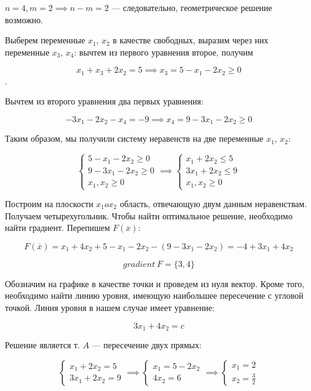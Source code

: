 \documentclass{article}
\begin{document}
$n = 4, m = 2 \implies n - m = 2$ — следовательно, геометрическое решение возможно.

Выберем переменные $x_1$, $x_2$ в качестве свободных, выразим через них переменные $x_3$, $x_4$: вычтем из первого уравнения второе, получим  

$$x_1 + x_3 + 2x_2 = 5 \implies x_3 = 5 - x_1 - 2x_2 \ge 0$$.

Вычтем из второго уравнения два первых уравнения:

$$-3x_1 - 2x_2 - x_4 = -9 \implies x_4 = 9 - 3x_1 - 2x_2 \ge 0$$

Таким образом, мы получили систему неравенств на две переменные $x_1$, $x_2$:

$$
\begin{cases}
    5 - x_1 - 2x_2 \ge 0 \\ 
    9 - 3x_1 - 2x_2 \ge 0 \\
    x_1, x_2 \ge 0
\end{cases} \implies \begin{cases}
    x_1 + 2x_2 \le 5 \\
    3x_1 + 2x_2 \le 9 \\
    x_1, x_2 \ge 0
\end{cases}
$$

Построим на плоскости $x_1 o x_2$ область, отвечающую двум данным неравенствам. Получаем четырехугольник. Чтобы найти оптимальное решение, необходимо найти градиент. Перепишем $F(\overline{x})$:

$$F(\overline{x}) = x_1 + 4x_2 + 5 - x_1 - 2x_2 - (9 - 3x_1 - 2x_2) = -4 + 3x_1 + 4x_2$$

$$gradient \ F = \{ 3, 4 \}$$

Обозначим на графике в качестве точки и проведем из нуля вектор. Кроме того, необходимо найти линию уровня, имеющую наибольшее пересечение с угловой точкой. Линия уровня в нашем случае имеет уравнение:

$$3x_1 + 4x_2 = c$$

Решение является т. $A$ — пересечение двух прямых:

$$
\begin{cases}
    x_1 + 2x_2 = 5 \\
    3x_1 + 2x_2 = 9
\end{cases} \implies \begin{cases}
    x_1 = 5 - 2x_2 \\
    4x_2 = 6
\end{cases} \implies \begin{cases}
    x_1 = 2 \\ 
    x_2 = \frac{3}{2}
\end{cases}
$$
\end{document}
